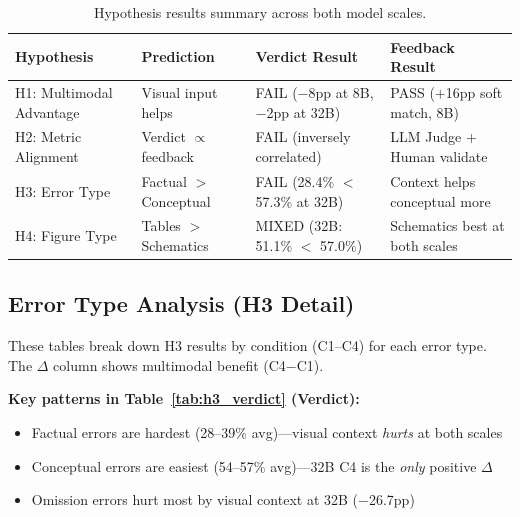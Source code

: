 \documentclass{article} %
\begin{document}
\begin{table}[h]
\centering
\small
\begin{tabular}{@{}llll@{}}
\toprule
Hypothesis & Prediction & Verdict Result & Feedback Result \\
\midrule
H1: Multimodal Advantage & Visual input helps & FAIL ($-$8pp at 8B, $-$2pp at 32B) & PASS ($+$16pp soft match, 8B) \\
H2: Metric Alignment & Verdict $\propto$ feedback & FAIL (inversely correlated) & LLM Judge + Human validate \\
H3: Error Type & Factual $>$ Conceptual & FAIL (28.4\% $<$ 57.3\% at 32B) & Context helps conceptual more \\
H4: Figure Type & Tables $>$ Schematics & MIXED (32B: 51.1\% $<$ 57.0\%) & Schematics best at both scales \\
\bottomrule
\end{tabular}
\caption{Hypothesis results summary across both model scales.}
\label{tab:hypotheses}
\end{table}

\subsection{Error Type Analysis (H3 Detail)}

These tables break down H3 results by condition (C1--C4) for each error type. The $\Delta$ column shows multimodal benefit (C4$-$C1).

\vspace{4pt}
\noindent\textbf{Key patterns in Table~\ref{tab:h3_verdict} (Verdict):}
\begin{itemize}[itemsep=1pt, topsep=2pt, leftmargin=*]
  \item Factual errors are hardest (28--39\% avg)---visual context \textit{hurts} at both scales
  \item Conceptual errors are easiest (54--57\% avg)---32B C4 is the \textit{only} positive $\Delta$
  \item Omission errors hurt most by visual context at 32B ($-$26.7pp)
\end{itemize}
\end{document}

